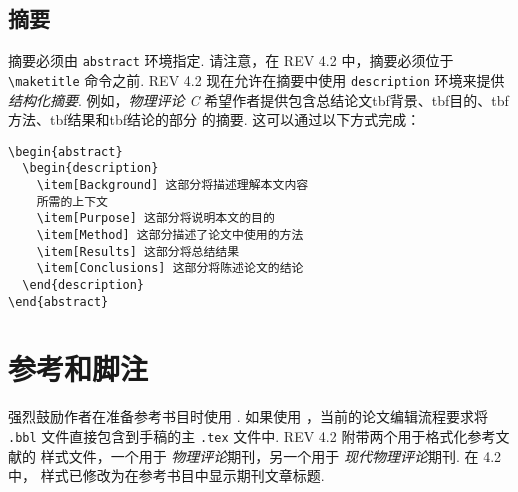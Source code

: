 \documentclass[twocolumn, amssymb, bibnotes, aps, prd, 10pt]{revtex4-2}
\newcommand{\revtex}{REV\hologo{TeX}}
\newcommand{\macro}[1]{\texttt{\textbackslash#1}}
\newcommand{\m}[1]{\macro{#1}}
\newcommand{\env}[1]{\texttt{#1}}
\begin{document}
\subsection{摘要}

摘要必须由 \env{abstract} 环境指定. 请注意，在 {\revtex} 4.2 中，摘要必须位于 \m{maketitle} 命令之前. {\revtex} 4.2 现在允许在摘要中使用 \env{description} 环境来提供 \textit{结构化摘要}. 例如，\textit{物理评论 C} 希望作者提供包含总结论文tbf{背景}、tbf{目的}、tbf{方法}、tbf{结果}和tbf{结论的部分 }的摘要. 这可以通过以下方式完成：
\begin{verbatim}
\begin{abstract}
  \begin{description}
    \item[Background] 这部分将描述理解本文内容
    所需的上下文
    \item[Purpose] 这部分将说明本文的目的
    \item[Method] 这部分描述了论文中使用的方法
    \item[Results] 这部分将总结结果
    \item[Conclusions] 这部分将陈述论文的结论
  \end{description}
\end{abstract}
\end{verbatim}

\section{参考和脚注}
强烈鼓励作者在准备参考书目时使用 . 如果使用 ，当前的论文编辑流程要求将 \texttt{.bbl} 文件直接包含到手稿的主 \texttt{.tex} 文件中. {\revtex} 4.2 附带两个用于格式化参考文献的  样式文件，一个用于 \textit{物理评论}期刊，另一个用于 \textit{现代物理评论}期刊. 在 4.2 中， 样式已修改为在参考书目中显示期刊文章标题.
\end{document}

